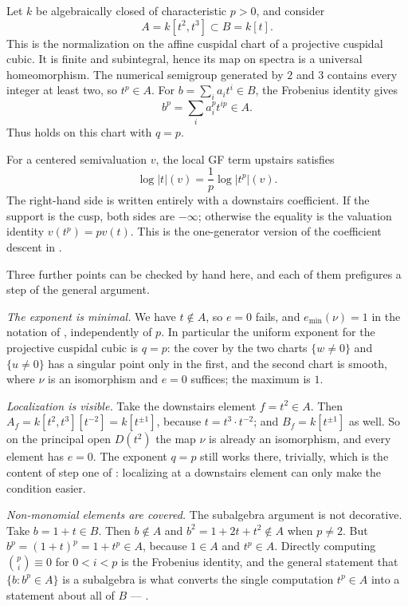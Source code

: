 \begin{example}
\label{ex:ch43-cusp-frobenius}
Let $k$ be algebraically closed of characteristic $p>0$, and consider
\[
                 A=k[t^2,t^3]\subset B=k[t].
\]
This is the normalization on the affine cuspidal chart of a projective
cuspidal cubic.  It is finite and subintegral, hence its map on spectra is a
universal homeomorphism.  The numerical semigroup generated by $2$ and
$3$ contains every integer at least two, so $t^p\in A$.  For
$b=\sum_i a_it^i\in B$, the Frobenius identity gives
\[
             b^p=\sum_i a_i^pt^{ip}\in A.
\]
Thus  holds on this chart with $q=p$.

For a centered semivaluation $v$, the local GF term upstairs satisfies
\[
             \log|t|(v)=\frac1p\log|t^p|(v).
\]
The right-hand side is written entirely with a downstairs coefficient.  If
the support is the cusp, both sides are $-\infty$; otherwise the equality
is the valuation identity $v(t^p)=pv(t)$.  This is the one-generator
version of the coefficient descent in
.

Three further points can be checked by hand here, and each of them
prefigures a step of the general argument.

\emph{The exponent is minimal.}  We have $t\notin A$, so $e=0$ fails,
and $e_{\min}(\nu)=1$ in the notation of
, independently of $p$.  In particular the
uniform exponent for the projective cuspidal cubic is $q=p$: the cover by
the two charts $\{w\ne0\}$ and $\{u\ne0\}$ has a singular point only in
the first, and the second chart is smooth, where $\nu$ is an isomorphism
and $e=0$ suffices; the maximum is $1$.

\emph{Localization is visible.}  Take the downstairs element
$f=t^2\in A$.  Then $A_f=k[t^2,t^3][t^{-2}]=k[t^{\pm1}]$, because
$t=t^3\cdot t^{-2}$; and $B_f=k[t^{\pm1}]$ as well.  So on the principal
open $D(t^2)$ the map $\nu$ is already an isomorphism, and every element
has $e=0$.  The exponent $q=p$ still works there, trivially, which is
the content of step one of
: localizing at a downstairs element
can only make the condition easier.

\emph{Non-monomial elements are covered.}  The subalgebra argument is not
decorative.  Take $b=1+t\in B$.  Then $b\notin A$ and
$b^2=1+2t+t^2\notin A$ when $p\ne2$.  But
$b^p=(1+t)^p=1+t^p\in A$, because $1\in A$ and $t^p\in A$.  Directly
computing $\binom pi\equiv0$ for $0<i<p$ is the Frobenius identity, and
the general statement that $\{b:b^p\in A\}$ is a subalgebra is what
converts the single computation $t^p\in A$ into a statement about all of
$B$ --- .
\end{example}

